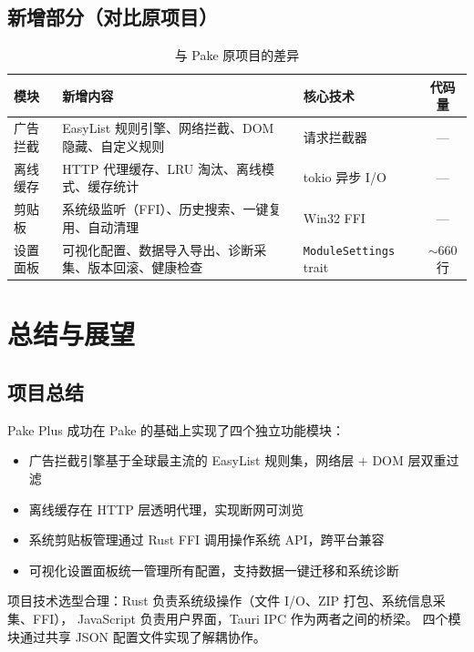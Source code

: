 \documentclass[12pt,a4paper]{ctexart}
\begin{document}
\subsection{新增部分（对比原项目）}

\begin{table}[h]
\centering
\small
\begin{tabularx}{\textwidth}{lXXc}
\toprule
模块 & 新增内容 & 核心技术 & 代码量 \\
\midrule
广告拦截   & EasyList 规则引擎、网络拦截、DOM 隐藏、自定义规则 & 请求拦截器 & --- \\
离线缓存   & HTTP 代理缓存、LRU 淘汰、离线模式、缓存统计 & tokio 异步 I/O & --- \\
剪贴板     & 系统级监听（FFI）、历史搜索、一键复用、自动清理 & Win32 FFI & --- \\
设置面板   & 可视化配置、数据导入导出、诊断采集、版本回滚、健康检查 & \texttt{ModuleSettings} trait & $\sim$660 行 \\
\bottomrule
\end{tabularx}
\caption{与 Pake 原项目的差异}
\end{table}

\section{总结与展望}

\subsection{项目总结}

Pake Plus 成功在 Pake 的基础上实现了四个独立功能模块：

\begin{itemize}
  \item 广告拦截引擎基于全球最主流的 EasyList 规则集，网络层 + DOM 层双重过滤
  \item 离线缓存在 HTTP 层透明代理，实现断网可浏览
  \item 系统剪贴板管理通过 Rust FFI 调用操作系统 API，跨平台兼容
  \item 可视化设置面板统一管理所有配置，支持数据一键迁移和系统诊断
\end{itemize}

项目技术选型合理：Rust 负责系统级操作（文件 I/O、ZIP 打包、系统信息采集、FFI），
JavaScript 负责用户界面，Tauri IPC 作为两者之间的桥梁。
四个模块通过共享 JSON 配置文件实现了解耦协作。
\end{document}
